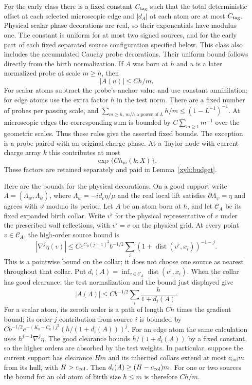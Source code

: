 For the early class there is a fixed constant $C_{\rm tag}$ such that the
total deterministic offset at each selected microscopic edge and $|d_A|$
at each atom are at most $C_{\rm tag}$. Physical scalar phase decorations
are real, so their exponentials have modulus one. The constant is uniform
for at most two signed sources, and for the early part of each fixed
separated source configuration specified below. This class also includes
the accumulated Cauchy probe decorations. Their uniform bound follows
directly from the birth normalization. If $A$ was born at $h$ and $u$ is
a later normalized probe at scale $m\ge h$, then
\[
 |A(u)|\le C h/m.
\]
For scalar atoms subtract the probe's anchor value and use constant
annihilation; for edge atoms use the extra factor $h$ in the test norm.
There are a fixed number of probes per passing scale, and
$\sum_{m\ge h,\ m/h\text{ a power of }L}h/m\le(1-L^{-1})^{-1}$.
At microscopic edges the corresponding sum is bounded by
$C\sum_{m\ge1}m^{-1}$ over the geometric scales. Thus these rules give
the asserted fixed bounds. The exception is a probe paired with an
original charge phase. At a Taylor node with current charge array $k$
this contributes at most
\begin{equation}\label{xyh:phase-probe-cost}
 \exp\{C h_m(k;X)\}.
\end{equation}
These factors are retained separately and paid in Lemma~\ref{xyh:budget}.

Here are the bounds for the physical decorations. On a good support write
$\Lambda=(\Lambda_w,\Lambda_\psi)$, where
$\Lambda_w=-i d_c\eta/\mu$ and the real local lift satisfies
$\partial\Lambda_\psi=\eta$ and agrees with $\vartheta$ modulo its period.
Let $A$ be an atom born at $h$, and let $\mathcal C_A$ be its fixed
expanded birth collar. Write $v^\flat$ for the physical representative of
$v$ under the prescribed wall reflections, with $v^\flat=v$ on the physical
grid. At every point $v\in\mathcal C_A$, the high-order source bound is
\[
 |\nabla^j\eta(v)|\le C e^{C_0(j+1)^2}b^{-1/2}
       \sum_i(1+\operatorname{dist}(v^\flat,x_i))^{-1-j}.
\]
This is a pointwise bound on the collar; it does not choose one source
as nearest throughout that collar. Put
$d_i(A)=\inf_{v\in\mathcal C_A}\operatorname{dist}(v^\flat,x_i)$.
When the collar has good clearance, the test normalization and the bound just displayed give
\[
 |A(\Lambda)|\le Cb^{-1/2}\sum_i\frac{h}{1+d_i(A)}.
\]
For a scalar atom, its zeroth order is a path of length $Ch$ times the
gradient bound; its order-$j$ contribution from source $i$ is bounded by
$C b^{-1/2}e^{-(K_0-C_0)j^2}(h/(1+d_i(A)))^j$. For an edge atom the same
calculation uses $h^{j+1}\nabla^j\eta$. The good clearance bounds
$h/(1+d_i(A))$ by a fixed constant, so the higher orders are absorbed
by the test weights. In particular, suppose the current support has
clearance $Hm$ and its inherited collars extend at most $c_{\rm col}m$
from its hull, with $H>c_{\rm col}$. Then
$d_i(A)\ge(H-c_{\rm col})m$. For one or two sources the bound for an old
atom of birth size $h\le m$ is therefore $Ch/m$.

